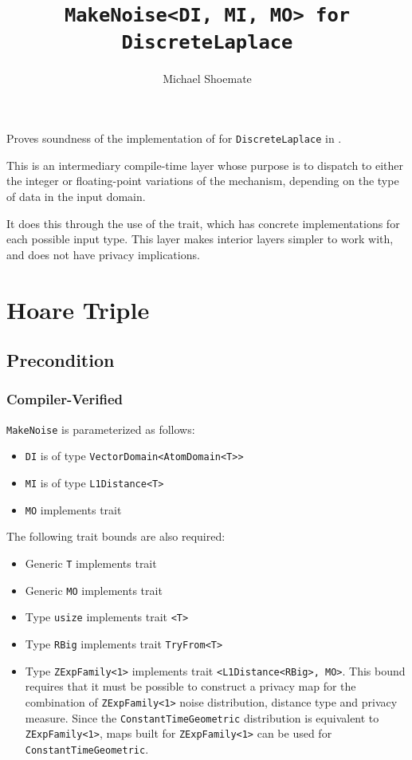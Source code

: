 \documentclass{article}
\title{\texttt{MakeNoise<DI, MI, MO> for DiscreteLaplace}}
\author{Michael Shoemate}
\date{}
\begin{document}
\maketitle

\contrib
Proves soundness of the implementation of  
for \texttt{DiscreteLaplace} in .

This is an intermediary compile-time layer whose purpose is 
to dispatch to either the integer or floating-point variations of the mechanism,
depending on the type of data in the input domain.

It does this through the use of the  trait,
which has concrete implementations for each possible input type.
This layer makes interior layers simpler to work with, and does not have privacy implications.

\section{Hoare Triple}
\subsection*{Precondition}
\subsubsection*{Compiler-Verified}
\texttt{MakeNoise} is parameterized as follows:
\begin{itemize}
    \item \texttt{DI} is of type \texttt{VectorDomain<AtomDomain<T>>}
    \item \texttt{MI} is of type \texttt{L1Distance<T>}
    \item \texttt{MO} implements trait 
\end{itemize}

The following trait bounds are also required:
\begin{itemize}
    \item Generic \texttt{T} implements trait 
    \item Generic \texttt{MO} implements trait 
    \item Type \texttt{usize} implements trait \texttt{<T>}
    \item Type \texttt{RBig} implements trait \texttt{TryFrom<T>}
    \item Type \texttt{ZExpFamily<1>} implements trait \texttt{<L1Distance<RBig>, MO>}.
        This bound requires that it must be possible to construct a privacy map for the combination of \texttt{ZExpFamily<1>} noise distribution, distance type and privacy measure.
        Since the \texttt{ConstantTimeGeometric} distribution is equivalent to \texttt{ZExpFamily<1>},
        maps built for \texttt{ZExpFamily<1>} can be used for \texttt{ConstantTimeGeometric}.
\end{itemize}
\end{document}
